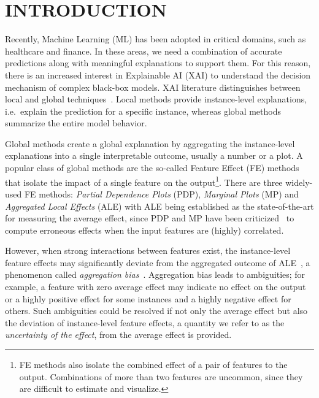 \documentclass[twoside]{article}
\begin{document}
\section{INTRODUCTION}

Recently, Machine Learning (ML) has been adopted in critical domains,
such as healthcare and finance. In these areas, we need a combination
of accurate predictions along with meaningful explanations to support
them. For this reason, there is an increased interest in Explainable
AI (XAI) to understand the decision mechanism of complex black-box
models. XAI literature distinguishes between local and global
techniques~\citep{Molnar2020interpretable}. Local methods provide
instance-level explanations, i.e.~explain the prediction for a
specific instance, whereas global methods summarize the entire model
behavior.

Global methods create a global explanation by aggregating the
instance-level explanations into a single interpretable outcome,
usually a number or a plot.  A popular class of global methods are the
so-called Feature Effect (FE) methods~\citep{Gromping2020MAEP} that
isolate the impact of a single feature on the output\footnote{FE
  methods also isolate the combined effect of a pair of features to
  the output. Combinations of more than two features are uncommon,
  since they are difficult to estimate and visualize.}. There are
three widely-used FE methods: \emph{Partial Dependence Plots}
(PDP)\citep{friedman2001greedy}, \emph{Marginal Plots}
(MP)\citep{apley2020visualizing} and \emph{Aggregated Local Effects}
(ALE)\citep{apley2020visualizing} with ALE being established as the
state-of-the-art for measuring the average effect, since PDP and MP
have been criticized~\citep{Gromping2020MAEP} to compute erroneous
effects when the input features are (highly) correlated.

However,
when strong interactions between features exist,
the instance-level feature effects may significantly deviate from
the aggregated outcome of ALE~\citep{herbinger2022repid}, a phenomenon called
\emph{aggregation bias}~\citep{mehrabi2021survey}. 
Aggregation bias leads to ambiguities; for example, a feature with zero average effect may
indicate no effect on the output or a highly positive effect for some instances and a highly negative effect for others. Such ambiguities could be resolved if not only the average effect but also the deviation of instance-level feature effects, a quantity we refer to as the \emph{uncertainty of the effect}, from the average effect is provided.
\end{document}
